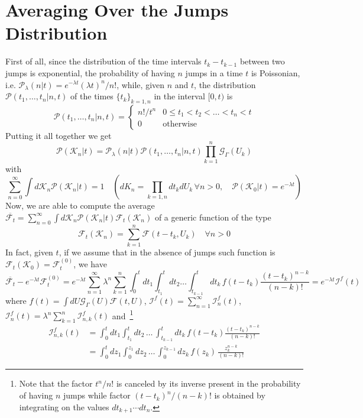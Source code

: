 \documentclass[12pt]{iopart}
\newcommand{\lx} {\left}
\newcommand{\rx} {\right}
\newcommand{\cP} {\mathcal{P}}
\newcommand{\cG} {\mathcal{G}}
\newcommand{\cI} {\mathcal{I}}
\newcommand{\cK} {\mathcal{K}}
\newcommand{\cF} {\mathcal{F}}
\begin{document}
\section{Averaging Over the Jumps Distribution}
First of all, since the distribution of the time intervals $t_k - t_{k-1}$ between two jumps is exponential, the probability of having $n$ jumps in a time $t$ is Poissonian, i.e. $\cP_\lambda(n|t) = e^{-\lambda t}(\lambda t)^n/n!$, while, given $n$ and $t$, the distribution $\cP(t_1,\dots,t_n|n,t)$ of the times $\{t_k\}_{k=1,n}$ in the interval $[0,t)$ is 
\begin{equation}
\cP(t_1,\dots,t_n|n,t) = 
\begin{cases}
n!/t^n & 0\leq t_1<t_2<\dots<t_n<t \\
0 & \text{otherwise}
\end{cases}
\end{equation}
Putting it all together we get
\begin{equation}
\cP(\cK_n|t) = \cP_\lambda(n|t) \cP(t_1,\dots,t_n|n,t) \prod_{k=1}^n \cG_\Gamma(U_k) 
\end{equation}
with
\begin{equation}
\sum_{n=0}^\infty \int d\cK_n \cP(\cK_n|t) = 1 \quad \lx( dK_n = \prod_{k=1,n} d t_k dU_k\, \forall n>0,\quad\cP(\cK_0|t)=e^{-\lambda t}\rx)
\end{equation}
Now, we are able to compute the average $\overline{\cF_t}=\sum_{n=0}^\infty \int d\cK_n \cP(\cK_n|t) \cF_t(\cK_n)$  of a generic function of the type 
\begin{equation}
    \cF_t(\cK_n) = \sum_{k=1}^n \cF(t-t_k,U_k) \quad \forall n>0
\end{equation}
In fact, given $t$, if we assume that in the absence of jumps such function is $\cF_t(\cK_0)=\cF^{(0)}_t$, we have
\begin{equation}
    \overline{\cF_t} - e^{-\lambda t}\cF^{(0)}_t = e^{-\lambda t} \sum_{n=1}^\infty \lambda^n \sum_{k=1}^n \int_0^t d t_1 \int_{t_1}^t d t_2 \dots \int_{t_{k-1}}^t d t_k\, f(t-t_k) \frac{(t-t_k)^{n-k}}{(n-k)!}
    = e^{-\lambda t} \cI^f(t)
\end{equation}
where $f(t) = \int dU \cG_{\Gamma}(U) \cF(t,U)$, $\cI^f(t) = \sum_{n=1}^\infty \cI^f_n(t)$, $\cI^f_n(t) = \lambda^n \sum_{k=1}^n \cI^f_{n,k}(t)$ and~\footnote{Note that the factor $t^n/n!$ is canceled by its inverse present in the probability of having $n$ jumps while factor $(t-t_k)^n/(n-k)!$ is obtained by integrating on the values $dt_{k+1}\cdots dt_n$.}
\begin{align}
    \cI^f_{n,k}(t) &= \int_0^t d t_1 \int_{t_1}^t d t_2 \, \dots \, \int_{t_{k-1}}^t d t_k \, f(t-t_k) \frac{(t-t_k)^{n-k}}{(n-k)!} \nonumber\\ 
    &= \int_0^t d z_1 \int_0^{z_1} d z_2 \, \dots \, \int_0^{z_{k-1}} d z_k \, f(z_k) \, \frac{z_k^{n-k}}{(n-k)!} 
\end{align}
\end{document}

